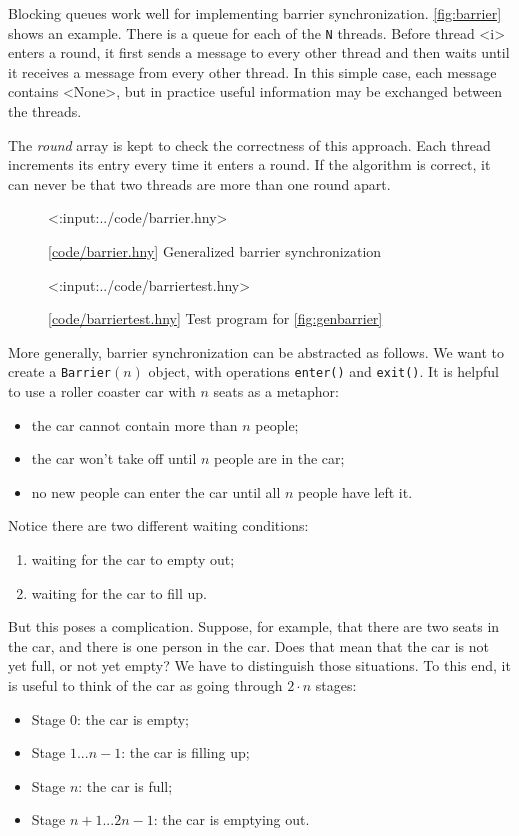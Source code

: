 \documentclass{report}
\newcommand{\harmonylink}[1]{%
[\href{https://harmony.cs.cornell.edu/#1}{\underline{#1}}]%
}
\newenvironment{code}{
\tcolorbox
}{
\endtcolorbox
}
\begin{document}
{Blocking queues work well for implementing barrier synchronization.
\autoref{fig:barrier} shows an example.  There is a queue
for each of the \texttt{N} threads.
Before thread <{i}> enters a round, it first sends a message to every
other thread and then waits until it receives a message from
every other thread.
In this simple case, each message contains <{None}>, but in practice useful
information may be exchanged between the threads.

The \textit{round} array is kept to check the correctness of this
approach.  Each thread increments its entry every time it enters
a round.  If the algorithm is correct, it can never be that two threads
are more than one round apart.

\begin{figure}
\begin{code}
<{:input:../code/barrier.hny}>
\end{code}
\caption{\harmonylink{code/barrier.hny} Generalized barrier synchronization}
\label{fig:genbarrier}
\end{figure}

\begin{figure}
\begin{code}
<{:input:../code/barriertest.hny}>
\end{code}
\caption{\harmonylink{code/barriertest.hny} Test program for \autoref{fig:genbarrier}}
\label{fig:barriertest}
\end{figure}

More generally, barrier synchronization can be abstracted as follows.
We want to create a \texttt{Barrier}$(n)$ object, with operations
\texttt{enter()} and \texttt{exit()}.  It is helpful to use
a roller coaster car with $n$ seats as a metaphor:
\begin{itemize}
\item the car cannot contain more than $n$ people;
\item the car won't take off until $n$ people are in the car;
\item no new people can enter the car until all $n$ people have left it.
\end{itemize}
Notice there are two different waiting conditions:
\begin{enumerate}
\item waiting for the car to empty out;
\item waiting for the car to fill up.
\end{enumerate}

But this poses a complication.  Suppose, for example, that there are two
seats in the car, and there is one person in the car.  Does that mean that
the car is not yet full, or not yet empty?  We have to distinguish
those situations.  To this end, it is useful to think of the car as going through
$2 \cdot n$ stages:
\begin{itemize}
\item[] Stage 0: the car is empty;
\item[] Stage $1 ... n-1$: the car is filling up;
\item[] Stage $n$: the car is full;
\item[] Stage $n+1 ... 2n - 1$: the car is emptying out.
\end{itemize}

}
\end{document}
